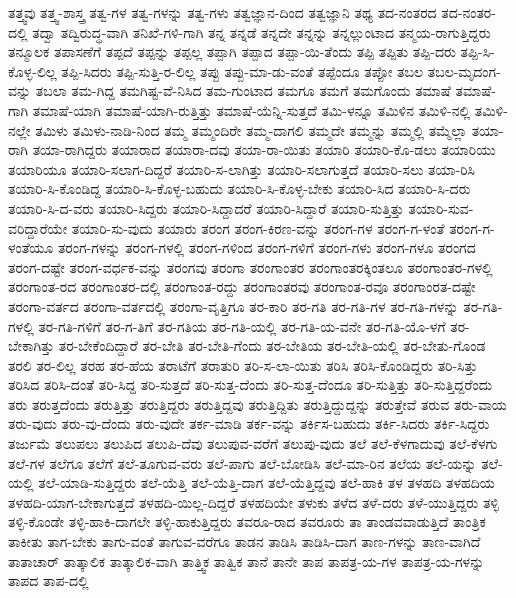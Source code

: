 {ತತ್ತ್ವವು
ತತ್ತ್ವ-ಶಾಸ್ತ್ರ
ತತ್ವ-ಗಳ
ತತ್ವ-ಗಳನ್ನು
ತತ್ವ-ಗಳು
ತತ್ವಜ್ಞಾನ-ದಿಂದ
ತತ್ವಜ್ಞಾನಿ
ತಥ್ಯ
ತದ-ನಂತರದ
ತದ-ನಂತರ-ದಲ್ಲಿ
ತದ್ವಾ
ತದ್ವಿರುದ್ಧ-ವಾಗಿ
ತನಿಖೆ-ಗಳಿ-ಗಾಗಿ
ತನ್ನ
ತನ್ನಡೆ
ತನ್ನದೇ
ತನ್ನನ್ನು
ತನ್ನಲ್ಲುಂಟಾದ
ತನ್ಮಯ-ರಾಗುತ್ತಿದ್ದರು
ತನ್ಮೂಲಕ
ತಪಾಸಣೆಗೆ
ತಪ್ಪದೆ
ತಪ್ಪನ್ನು
ತಪ್ಪಲ್ಲ
ತಪ್ಪಾಗಿ
ತಪ್ಪಾದ
ತಪ್ಪಾ-ಯಿ-ತೆಂದು
ತಪ್ಪಿ
ತಪ್ಪಿತು
ತಪ್ಪಿ-ದರು
ತಪ್ಪಿ-ಸಿ-ಕೊಳ್ಳ-ಲಿಲ್ಲ
ತಪ್ಪಿ-ಸಿದರು
ತಪ್ಪಿ-ಸುತ್ತಿ-ರ-ಲಿಲ್ಲ
ತಪ್ಪು
ತಪ್ಪು-ಮಾ-ಡು-ವಂತೆ
ತಪ್ಪೆಂದೂ
ತಪ್ಪೋ
ತಬಲ
ತಬಲ-ಮೃದಂಗ-ವನ್ನು
ತಬಲಾ
ತಮ-ಗಿದ್ದ
ತಮಗಿಷ್ಟ-ವೆ-ನಿಸಿದ
ತಮ-ಗುಂಟಾದ
ತಮಗೂ
ತಮಗೆ
ತಮಗೊಂದು
ತಮಾಷೆ
ತಮಾಷೆ-ಗಾಗಿ
ತಮಾಷೆ-ಯಾಗಿ
ತಮಾಷೆ-ಯಾಗಿ-ರುತ್ತಿತ್ತು
ತಮಾಷೆ-ಯೆನ್ನಿ-ಸುತ್ತದೆ
ತಮಿ-ಳನ್ನೂ
ತಮಿಳಿನ
ತಮಿಳಿ-ನಲ್ಲಿ
ತಮಿಳಿ-ನಲ್ಲೇ
ತಮಿಳು
ತಮಿಳು-ನಾಡಿ-ನಿಂದ
ತಮ್ಮ
ತಮ್ಮಂದಿರೇ
ತಮ್ಮ-ದಾಗಲಿ
ತಮ್ಮದೇ
ತಮ್ಮನ್ನು
ತಮ್ಮಲ್ಲಿ
ತಮ್ಮೆಲ್ಲಾ
ತಯಾ-ರಾಗಿ
ತಯಾ-ರಾಗಿದ್ದರು
ತಯಾರಾದ
ತಯಾರಾ-ದವು
ತಯಾ-ರಾ-ಯಿತು
ತಯಾರಿ
ತಯಾರಿ-ಕೊ-ಡಲು
ತಯಾರಿಯು
ತಯಾರಿಯೂ
ತಯಾರಿ-ಸಲಾಗ-ದಿದ್ದರೆ
ತಯಾರಿ-ಸ-ಲಾಗಿತ್ತು
ತಯಾರಿ-ಸಲಾಗುತ್ತದೆ
ತಯಾರಿ-ಸಲು
ತಯಾ-ರಿಸಿ
ತಯಾರಿ-ಸಿ-ಕೊಂಡಿದ್ದ
ತಯಾರಿ-ಸಿ-ಕೊಳ್ಳ-ಬಹುದು
ತಯಾರಿ-ಸಿ-ಕೊಳ್ಳ-ಬೇಕು
ತಯಾರಿ-ಸಿದ
ತಯಾರಿ-ಸಿ-ದರು
ತಯಾರಿ-ಸಿ-ದ-ವರು
ತಯಾರಿ-ಸಿದ್ದರು
ತಯಾರಿ-ಸಿದ್ದಾದರೆ
ತಯಾರಿ-ಸಿದ್ದಾರೆ
ತಯಾರಿ-ಸುತ್ತಿತ್ತು
ತಯಾರಿ-ಸುವ-ವರಿದ್ದಾರೆಯೇ
ತಯಾರಿ-ಸು-ವುದು
ತಯಾರು
ತರಂಗ
ತರಂಗ-ಕಿರಣ-ವನ್ನು
ತರಂಗ-ಗಳ
ತರಂಗ-ಗ-ಳಂತೆ
ತರಂಗ-ಗ-ಳಂತೆಯೂ
ತರಂಗ-ಗಳನ್ನು
ತರಂಗ-ಗಳಲ್ಲಿ
ತರಂಗ-ಗಳಿಂದ
ತರಂಗ-ಗಳಿಗೆ
ತರಂಗ-ಗಳು
ತರಂಗ-ಗಳೂ
ತರಂಗದ
ತರಂಗ-ದಷ್ಟೇ
ತರಂಗ-ವರ್ಧಕ-ವನ್ನು
ತರಂಗವು
ತರಂಗಾ
ತರಂಗಾಂತರ
ತರಂಗಾಂತರಕ್ಕಿಂತಲೂ
ತರಂಗಾಂತರ-ಗಳಲ್ಲಿ
ತರಂಗಾಂತ-ರದ
ತರಂಗಾಂತರ-ದಲ್ಲಿ
ತರಂಗಾಂತ-ರದ್ದು
ತರಂಗಾಂತರವು
ತರಂಗಾಂತ-ರವೂ
ತರಂಗಾಂರತ-ದಷ್ಟೇ
ತರಂಗಾ-ವರ್ತದ
ತರಂಗಾ-ವರ್ತದಲ್ಲಿ
ತರಂಗಾ-ವೃತ್ತಿಗೂ
ತರ-ಕಾರಿ
ತರ-ಗತಿ
ತರ-ಗತಿ-ಗಳ
ತರ-ಗತಿ-ಗಳನ್ನು
ತರ-ಗತಿ-ಗಳಲ್ಲಿ
ತರ-ಗತಿ-ಗಳಿಗೆ
ತರ-ಗ-ತಿಗೆ
ತರ-ಗತಿಯ
ತರ-ಗತಿ-ಯಲ್ಲಿ
ತರ-ಗತಿ-ಯ-ವನೇ
ತರ-ಗತಿ-ಯೊ-ಳಗೆ
ತರ-ಬೇಕಾಗಿತ್ತು
ತರ-ಬೇಕೆಂದಿದ್ದಾರೆ
ತರ-ಬೇತಿ
ತರ-ಬೇತಿ-ಗೆಂದು
ತರ-ಬೇತಿಯ
ತರ-ಬೇತಿ-ಯಲ್ಲಿ
ತರ-ಬೇತು-ಗೊಂಡ
ತರಲಿ
ತರ-ಲಿಲ್ಲ
ತರಹ
ತರ-ಹೆಯ
ತರಾಟೆಗೆ
ತರಾತುರಿ
ತರಿ-ಸ-ಲಾ-ಯಿತು
ತರಿಸಿ
ತರಿಸಿ-ಕೊಂಡಿದ್ದರು
ತರಿ-ಸಿತ್ತು
ತರಿಸಿದ
ತರಿಸಿ-ದಂತೆ
ತರಿ-ಸಿದ್ದ
ತರಿ-ಸುತ್ತದೆ
ತರಿ-ಸುತ್ತ-ದೆಂದು
ತರಿ-ಸುತ್ತ-ದೆಂದೂ
ತರಿ-ಸುತ್ತಿತ್ತು
ತರಿ-ಸುತ್ತಿದ್ದರೆಂದು
ತರು
ತರುತ್ತದೆಂದು
ತರುತ್ತಿತ್ತು
ತರುತ್ತಿದ್ದರು
ತರುತ್ತಿದ್ದವು
ತರುತ್ತಿದ್ದಿತು
ತರುತ್ತಿದ್ದುದ್ದನ್ನು
ತರುತ್ತೇವೆ
ತರುವ
ತರು-ವಾಯ
ತರು-ವುದು
ತರು-ವು-ದೆಂದು
ತರು-ವುದೇ
ತರ್ಕ-ಮಾಡಿ
ತರ್ಕ-ವನ್ನು
ತರ್ಕಿಸ-ಬಹುದು
ತರ್ಕಿ-ಸಿದರು
ತರ್ಕಿ-ಸಿದ್ದರು
ತರ್ಜುಮೆ
ತಲುಪಲು
ತಲುಪಿದ
ತಲುಪಿ-ದೆವು
ತಲುಪುವ-ವರೆಗೆ
ತಲುಪು-ವುದು
ತಲೆ
ತಲೆ-ಕೆಳಗಾದುವು
ತಲೆ-ಕೆಳಗು
ತಲೆ-ಗಳ
ತಲೆಗೂ
ತಲೆಗೆ
ತಲೆ-ತೂಗುವ-ವರು
ತಲೆ-ಪಾಗು
ತಲೆ-ಬೋಡಿಸಿ
ತಲೆ-ಮಾ-ರಿನ
ತಲೆಯ
ತಲೆ-ಯನ್ನು
ತಲೆ-ಯಲ್ಲಿ
ತಲೆ-ಯಾಡಿ-ಸುತ್ತಿದ್ದರು
ತಲೆ-ಯೆತ್ತಿ
ತಲೆ-ಯೆತ್ತಿ-ದಾಗ
ತಲೆ-ಯೆತ್ತಿದ್ದವು
ತಲೆ-ಹಾಕಿ
ತಳ
ತಳಹದಿ
ತಳಹದಿಯ
ತಳಹದಿ-ಯಾಗ-ಬೇಕಾಗುತ್ತದೆ
ತಳಹದಿ-ಯಿಲ್ಲ-ದಿದ್ದರೆ
ತಳಹದಿಯೇ
ತಳುಕು
ತಳೆದ
ತಳೆ-ದರು
ತಳೆ-ಯುತ್ತಿದ್ದರು
ತಳ್ಳಿ
ತಳ್ಳಿ-ಕೊಂಡೇ
ತಳ್ಳಿ-ಹಾಕಿ-ದಾಗಲೇ
ತಳ್ಳಿ-ಹಾಕುತ್ತಿದ್ದರು
ತವರೂ-ರಾದ
ತವರೂರು
ತಾ
ತಾಂಡವವಾಡುತ್ತಿದೆ
ತಾಂತ್ರಿಕ
ತಾಕೀತು
ತಾಗ-ಬೇಕು
ತಾಗು-ವಂತೆ
ತಾಗುವ-ವರೆಗೂ
ತಾಡನ
ತಾಡಿಸಿ
ತಾಡಿಸಿ-ದಾಗ
ತಾಣ-ಗಳನ್ನು
ತಾಣ-ವಾಗಿದೆ
ತಾತಾಚಾರ್
ತಾತ್ಕಾಲಿಕ
ತಾತ್ಕಾಲಿಕ-ವಾಗಿ
ತಾತ್ತ್ವಿಕ
ತಾತ್ವಿಕ
ತಾನೆ
ತಾನೇ
ತಾಪ
ತಾಪತ್ರ-ಯ-ಗಳ
ತಾಪತ್ರ-ಯ-ಗಳನ್ನು
ತಾಪದ
ತಾಪ-ದಲ್ಲಿ
}
